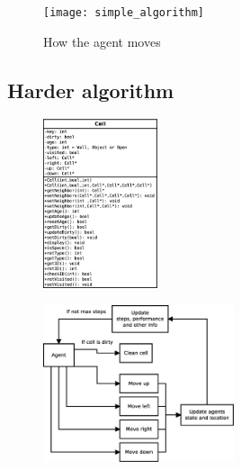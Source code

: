 \begin{figure}[h]\label{fig:simpleAlgorithm} \centering
\texttt{[image: simple\_algorithm]}
\caption{How the agent moves}
\end{figure}
	
\subsection{Harder algorithm}


\begin{figure}[h] \label{fig:}	\centering
\includegraphics[width=0.3\textwidth]{cell_uml}
\caption{}
\end{figure}

\begin{figure}[h] \label{fig:}	\centering
\includegraphics[width=0.5\textwidth]{agent}
\caption{}
\end{figure}




